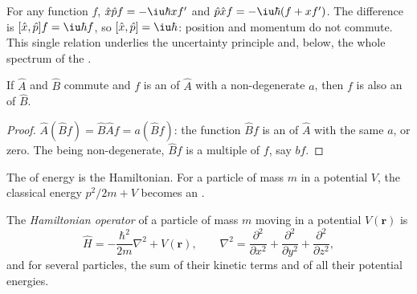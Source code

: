 \begin{example}\label{ex:b3:quantum-model-systems:canonical}
For any function $f$, $\hat x\hat pf = -\iu\hbar xf'$ and $\hat p\hat xf =
-\iu\hbar(f + xf')$. The difference is $[\hat x,\hat p]f = \iu\hbar f$, so
$[\hat x,\hat p] = \iu\hbar$: position and momentum do not commute. This
single relation underlies the uncertainty principle and, below, the whole
spectrum of the .
\end{example}

\begin{proposition}\label{prop:b3:quantum-model-systems:commuting}
If $\hat A$ and $\hat B$ commute and $f$ is an  of $\hat A$
with a non-degenerate  $a$, then $f$ is also an  of
$\hat B$.
\end{proposition}

\begin{proof}
$\hat A(\hat Bf) = \hat B\hat Af = a(\hat Bf)$: the function $\hat Bf$ is an
 of $\hat A$ with the same  $a$, or zero. The
 being non-degenerate, $\hat Bf$ is a multiple of $f$, say $bf$.
\end{proof}

The  of energy is the Hamiltonian. For a particle of mass $m$ in a
potential $V$, the classical energy $p^2/2m + V$ becomes an .

\begin{definition}\label{def:b3:quantum-model-systems:schrodinger}
The \emph{Hamiltonian operator} of a particle of
mass $m$ moving in a potential $V(\mathbf r)$ is
\[
\hat H = -\frac{\hbar^2}{2m}\nabla^2 + V(\mathbf r), \qquad \nabla^2 =
\frac{\partial^2}{\partial x^2} + \frac{\partial^2}{\partial y^2} +
\frac{\partial^2}{\partial z^2},
\]
and for several particles, the sum of their kinetic terms and of all their
potential energies.
\end{definition}

